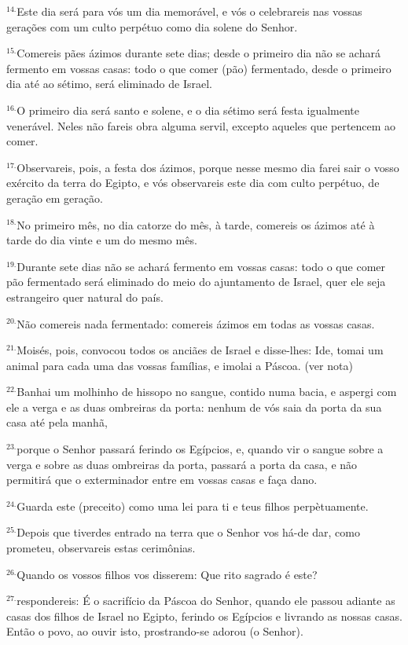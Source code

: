 \documentclass[a4paper,14pt]{extarticle} \usepackage[utf8]{inputenc}
\begin{document}
$^{14.}$Este dia será para vós um dia memorável, e vós o celebrareis nas vossas gerações com um culto perpétuo como dia solene do Senhor.

$^{15.}$Comereis pães ázimos durante sete dias; desde o primeiro dia não se achará fermento em vossas casas: todo o que comer (pão) fermentado, desde o primeiro dia até ao sétimo, será eliminado de Israel.

$^{16.}$O primeiro dia será santo e solene, e o dia sétimo será festa igualmente venerável. Neles não fareis obra alguma servil, excepto aqueles que pertencem ao comer.

$^{17.}$Observareis, pois, a festa dos ázimos, porque nesse mesmo dia farei sair o vosso exército da terra do Egipto, e vós observareis este dia com culto perpétuo, de geração em geração.

$^{18.}$No primeiro mês, no dia catorze do mês, à tarde, comereis os ázimos até à tarde do dia vinte e um do mesmo mês.

$^{19.}$Durante sete dias não se achará fermento em vossas casas: todo o que comer pão fermentado será eliminado do meio do ajuntamento de Israel, quer ele seja estrangeiro quer natural do país.

$^{20.}$Não comereis nada fermentado: comereis ázimos em todas as vossas casas.

$^{21.}$Moisés, pois, convocou todos os anciães de Israel e disse-lhes: Ide, tomai um animal para cada uma das vossas famílias, e imolai a Páscoa. (ver nota)

$^{22.}$Banhai um molhinho de hissopo no sangue, contido numa bacia, e aspergi com ele a verga e as duas ombreiras da porta: nenhum de vós saia da porta da sua casa até pela manhã,

$^{23.}$porque o Senhor passará ferindo os Egípcios, e, quando vir o sangue sobre a verga e sobre as duas ombreiras da porta, passará a porta da casa, e não permitirá que o exterminador entre em vossas casas e faça dano.

$^{24.}$Guarda este (preceito) como uma lei para ti e teus filhos perpètuamente.

$^{25.}$Depois que tiverdes entrado na terra que o Senhor vos há-de dar, como prometeu, observareis estas cerimônias.

$^{26.}$Quando os vossos filhos vos disserem: Que rito sagrado é este?

$^{27.}$respondereis: É o sacrifício da Páscoa do Senhor, quando ele passou adiante as casas dos filhos de Israel no Egipto, ferindo os Egípcios e livrando as nossas casas. Então o povo, ao ouvir isto, prostrando-se adorou (o Senhor).
\end{document}
